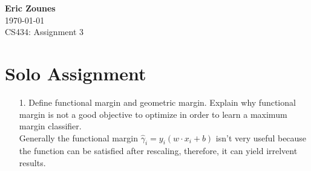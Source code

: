 \documentclass[12pt,letterpaper]{article}
\begin{document}
\setcounter{subsection}{2} 
\begin{flushright}
\end{flushright}
\begin{flushleft}
\textbf{Eric Zounes} \\
\today \\ 
CS434: Assignment 3
\end{flushleft}
\section[2]{Solo Assignment} 
\begin{enumerate} 
	\item[1.] Define functional margin and geometric margin. Explain why functional margin is not a good objective to optimize in order to learn a maximum margin classifier. \\
	Generally the functional margin $\hat{\gamma}_{i} = y_{i}(w\cdot x_{i} + b)$ isn't very useful because the function can be satisfied after rescaling, therefore, it can yield irrelvent results. 


\end{enumerate}
\end{document}
